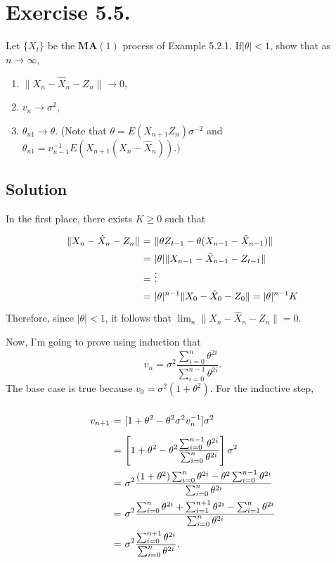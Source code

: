 \section*{Exercise 5.5.}

Let $\{X_{t} \}$ be the $\mathbf{M A} ( 1 )$ process of Example 5.2.1. $\mathrm{I f} \left| \theta\right| < 1$, show that as $n \to\infty$,
\begin{enumerate}[label=(\alph*)]
    \item $\| X_{n}-{\hat{X}}_{n}-Z_{n} \| \to 0$,
    \item $v_{n} \rightarrow\sigma^{2}$,
    \item $\theta_{n 1} \rightarrow\theta.$ (Note that $\theta=E ( X_{n+1} Z_{n} ) \sigma^{-2}$ and $\theta_{n 1}=v_{n-1}^{-1} E ( X_{n+1} ( X_{n}-\hat{X}_{n} ) ). )$ 
\end{enumerate}

\subsection*{Solution}

In the first place, there exists $K \geq 0$ such that
\[ \everymath{\displaystyle} 
\arraycolsep=1.8pt\def\arraystretch{1.5}
\begin{array}{rcl}
    \|X_n - \hat{X}_n - Z_n \| & = & \|\theta Z_{t-1} - \theta (X_{n-1} - \hat{X}_{n-1})\|\\
    & = & |\theta| \|X_{n-1} - \hat{X}_{n-1} - Z_{t-1} \|\\
    & = & \vdots \\
    & = & |\theta|^{n-1} \|X_{0} - \hat{X}_{0} - Z_{0} \| = |\theta|^{n-1}  K
\end{array} \]
Therefore, since $|\theta|< 1$, it follows that $\lim_{n}\|X_n - \hat{X}_n - Z_n \| = 0$.

Now, I'm going to prove using induction that
\[ v_n = \sigma^2 \frac{\sum_{i = 0}^{n} \theta^{2i}}{\sum_{i = 0}^{n-1} \theta^{2i}}. \]
The base case is true because $v_0 = \sigma^2 (1+\theta^2)$. For the inductive step,
\[ \everymath{\displaystyle}
\arraycolsep=1.8pt\def\arraystretch{2.5}
\begin{array}{rcl}
    v_{n+1} & = & [1+\theta^2 - \theta^2 \sigma^2 v_{n}^{-1}]\sigma^2\\
    & = & \left[ 1+\theta^2 - \theta^2 \frac{\sum_{i = 0}^{n-1} \theta^{2i}}{\sum_{i = 0}^{n} \theta^{2i}} \right]\sigma^2\\
    & = & \sigma^2 \frac{(1+\theta^2)\sum_{i = 0}^{n} \theta^{2i} - \theta^2 \sum_{i = 0}^{n-1} \theta^{2i}}{\sum_{i = 0}^{n} \theta^{2i}}\\
    & = & \sigma^2 \frac{\sum_{i = 0}^{n} \theta^{2i} + \sum_{i = 1}^{n+1} \theta^{2i} - \sum_{i = 1}^{n} \theta^{2i}}{\sum_{i = 0}^{n} \theta^{2i}}\\
    & = & \sigma^2 \frac{\sum_{i = 0}^{n+1} \theta^{2i}}{\sum_{i = 0}^{n} \theta^{2i}}.
\end{array} \]

